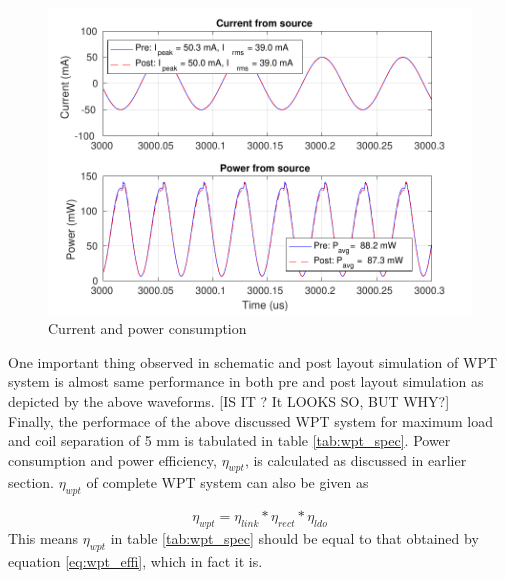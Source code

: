\documentclass[12pt,a4paper,UKenglish]{article}
\begin{document}
\begin{figure} [H]
  \centering
  \includegraphics[width=\textwidth]{img/wpt_PI_both.pdf} 
 \caption{Current and power consumption} 
\label{fig:wpt_PI} 
\end{figure}

One important thing observed in schematic and post layout simulation of WPT system is almost same performance in both pre and post layout simulation as depicted by the above waveforms. [IS IT ? It LOOKS SO, BUT WHY?] \\

Finally, the performace of the above discussed WPT system for maximum load and coil separation of 5 mm is tabulated in table \ref{tab:wpt_spec}. Power consumption and power efficiency, $\eta_{wpt}$, is calculated as discussed in earlier section. $\eta_{wpt}$ of complete WPT system can also be given as 

\begin{equation} \label{eq:wpt_effi} 
\eta_{wpt} = \eta_{link}*\eta_{rect}*\eta_{ldo}
\end{equation}
This means $\eta_{wpt}$ in table \ref{tab:wpt_spec} should be equal to that obtained by equation \ref{eq:wpt_effi}, which in fact it is. 
\end{document}
